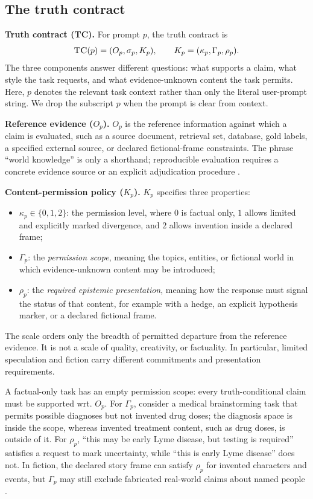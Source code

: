 \documentclass{clv2025}
\newcommand{\TC}{\textsc{TC}}
\begin{document}
\subsection{The truth contract}

\textbf{Truth contract (\TC).}
For prompt $p$, the truth contract is
\[
  \TC(p)=(O_p,\sigma_p,K_p), \qquad K_p=(\kappa_p,\Gamma_p,\rho_p).
\]
The three components answer different questions: what supports a claim, what style the task requests, and what evidence-unknown content the task permits.
Here, $p$ denotes the relevant task context rather than only the literal user-prompt string.
We drop the subscript $p$ when the prompt is clear from context.

\textbf{Reference evidence ($O_p$).}
$O_p$ is the reference information against which a claim is evaluated, such as a source document, retrieval set, database, gold labels, a specified external source, or declared fictional-frame constraints.
The phrase ``world knowledge'' is only a shorthand; reproducible evaluation requires a concrete evidence source or an explicit adjudication procedure \citep{ji_survey_2023,bang_hallulens_2025}.

\textbf{Content-permission policy ($K_p$).}
$K_p$ specifies three properties:
\begin{itemize}
  \item $\kappa_p\in\{0,1,2\}$: the permission level, where $0$ is factual only, $1$ allows limited and explicitly marked divergence, and $2$ allows invention inside a declared frame;
  \item $\Gamma_p$: the \emph{permission scope}, meaning the topics, entities, or fictional world in which evidence-unknown content may be introduced;
  \item $\rho_p$: the \emph{required epistemic presentation}, meaning how the response must signal the status of that content, for example with a hedge, an explicit hypothesis marker, or a declared fictional frame.
\end{itemize}
The scale orders only the breadth of permitted departure from the reference evidence.
It is not a scale of quality, creativity, or factuality.
In particular, limited speculation and fiction carry different commitments and presentation requirements.

A factual-only task has an empty permission scope: every truth-conditional claim must be supported wrt. $O_p$.
For $\Gamma_p$, consider a medical brainstorming task that permits possible diagnoses but not invented drug doses; the diagnosis space is inside the scope, whereas invented treatment content, such as drug doses, is outside of it.
For $\rho_p$, ``this may be early Lyme disease, but testing is required'' satisfies a request to mark uncertainty, while ``this is early Lyme disease'' does not.
In fiction, the declared story frame can satisfy $\rho_p$ for invented characters and events, but $\Gamma_p$ may still exclude fabricated real-world claims about named people \citep{searle_logical_1975}.
\end{document}
